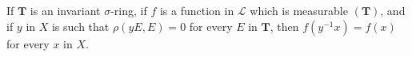 If $\mathbf{T}$ is an invariant $\sigma$-ring, if $f$ is a function in $\mathcal{L}$ which is measurable $(\mathbf{T})$, and if $y$ in $X$ is such that $\rho(yE, E) = 0$ for every $E$ in $\mathbf{T}$, then $f(y^{-1}x) = f(x)$ for every $x$ in $X$.